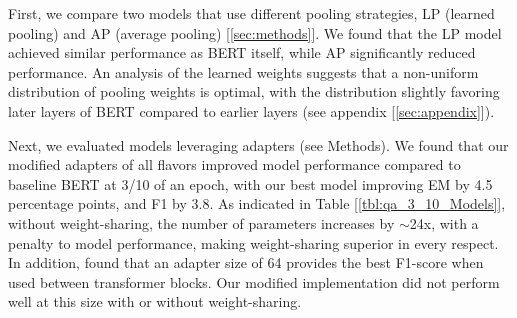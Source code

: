First, we compare two models that use different pooling strategies, LP (learned pooling) and AP (average pooling) [\ref{sec:methods}]. We found that the LP model achieved similar performance as BERT itself, while AP significantly reduced performance. An analysis of the learned weights suggests that a non-uniform distribution of pooling weights is optimal, with the distribution slightly favoring later layers of BERT compared to earlier layers (see appendix [\ref{sec:appendix}]).

Next, we evaluated models leveraging adapters (see Methods). We found that our modified adapters of all flavors improved model performance compared to baseline BERT at 3/10 of an epoch, with our best model improving EM by 4.5 percentage points, and F1 by 3.8. As indicated in Table [\ref{tbl:qa_3_10_Models}], without weight-sharing, the number of parameters increases by $\sim$24x, with a penalty to model performance, making weight-sharing superior in every respect. In addition, \cite{DBLP:journals/corr/abs-1902-00751} found that an adapter size of 64 provides the best F1-score when used between transformer blocks. Our modified implementation did not perform well at this size with or without weight-sharing.

